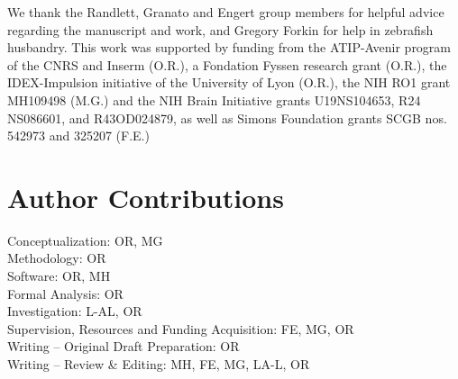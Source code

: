 \documentclass[9pt,lineno]{RandlettLab_elife}
\begin{document}
We thank the Randlett, Granato and Engert group members for helpful advice regarding the manuscript and work, and Gregory Forkin for help in zebrafish husbandry. This work was supported by funding from the ATIP-Avenir program of the CNRS and Inserm (O.R.), a Fondation Fyssen research grant (O.R.), the IDEX-Impulsion initiative of the University of Lyon (O.R.), the NIH RO1 grant MH109498 (M.G.) and the NIH Brain Initiative grants U19NS104653, R24 NS086601, and R43OD024879, as well as Simons Foundation grants SCGB nos. 542973 and 325207 (F.E.)


\section{Author Contributions}

Conceptualization: OR, MG \\
Methodology: OR \\
Software: OR, MH \\
Formal Analysis: OR \\ 
Investigation: L-AL, OR \\
Supervision, Resources and Funding Acquisition: FE, MG, OR \\
Writing – Original Draft Preparation: OR \\
Writing – Review & Editing: MH, FE, MG, LA-L, OR \\



\end{document}
